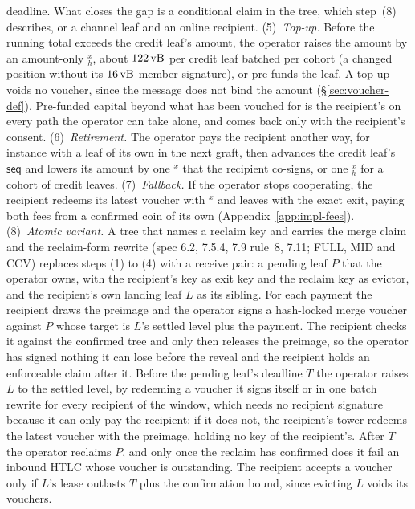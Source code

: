 deadline. What closes the gap is a conditional claim in the tree, which
step~(8) describes, or a channel leaf and an online recipient.
(5)~\emph{Top-up.} Before the running total exceeds the credit leaf's
amount, the operator raises the amount by an amount-only
$_h^{x}$, about $122\,\mathrm{vB}$ per credit leaf batched per cohort (a changed position
without its $16\,\mathrm{vB}$ member signature),
or pre-funds the leaf. A top-up voids no voucher, since the message does
not bind the amount (\S\ref{sec:voucher-def}). Pre-funded capital beyond
what has been vouched for is the recipient's on every path the operator
can take alone, and comes back only with the recipient's consent.
(6)~\emph{Retirement.} The operator pays the recipient another way, for
instance with a leaf of its own in the next graft, then advances the
credit leaf's $\mathsf{seq}$ and lowers its amount by one
$^{x}$ that the recipient co-signs, or one
$_h^{x}$ for a cohort of credit leaves.
(7)~\emph{Fallback.} If the operator stops cooperating, the recipient
redeems its latest voucher with $^{x}$ and leaves with the
exact exit, paying both fees from a confirmed coin of its own
(Appendix~\ref{app:impl-fees}).
(8)~\emph{Atomic variant.} A tree that names a reclaim key and carries the
merge claim and the reclaim-form rewrite (spec 6.2, 7.5.4, 7.9 rule~8, 7.11;
FULL, MID and CCV) replaces steps (1) to (4) with a receive pair: a pending
leaf $P$ that the operator owns, with the recipient's key as exit key and
the reclaim key as evictor, and the recipient's own landing leaf $L$ as its
sibling. For each payment the recipient draws the preimage and the operator
signs a hash-locked merge voucher against $P$ whose target is $L$'s settled
level plus the payment. The recipient checks it against the confirmed tree
and only then releases the preimage, so the operator has signed nothing it
can lose before the reveal and the recipient holds an enforceable claim
after it. Before the pending leaf's deadline $T$ the operator raises $L$ to
the settled level, by redeeming a voucher it signs itself or in one batch
rewrite for every recipient of the window, which needs no recipient
signature because it can only pay the recipient; if it does not, the
recipient's tower redeems the latest voucher with the preimage, holding no
key of the recipient's. After $T$ the operator reclaims $P$, and only once
the reclaim has confirmed does it fail an inbound HTLC whose voucher is
outstanding. The recipient accepts a voucher only if $L$'s lease outlasts
$T$ plus the confirmation bound, since evicting $L$ voids its vouchers.

